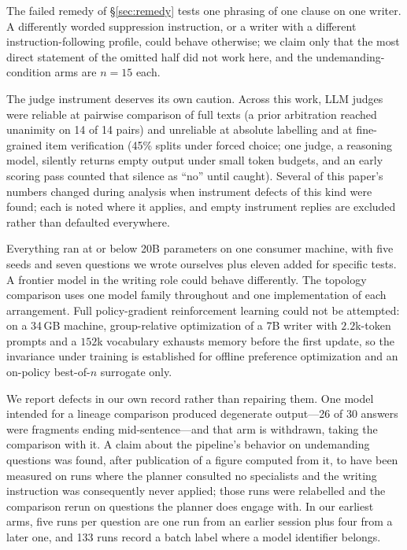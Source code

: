 \documentclass[11pt]{article}
\begin{document}
The failed remedy of \S\ref{sec:remedy} tests one phrasing of one clause on
one writer. A differently worded suppression instruction, or a writer with a
different instruction-following profile, could behave otherwise; we claim only
that the most direct statement of the omitted half did not work here, and the
undemanding-condition arms are $n{=}15$ each.

The judge instrument deserves its own caution. Across this work, LLM judges
were reliable at pairwise comparison of full texts (a prior arbitration
reached unanimity on 14 of 14 pairs) and unreliable at absolute labelling
and at fine-grained item verification (45\% splits under forced choice;
one judge, a reasoning model, silently returns empty output under small
token budgets, and an early scoring pass counted that silence as ``no''
until caught). Several of this paper's numbers changed during analysis when
instrument defects of this kind were found; each is noted where it applies,
and empty instrument replies are excluded rather than defaulted everywhere.

Everything ran at or below 20B parameters on one consumer machine, with five
seeds and seven questions we wrote ourselves plus eleven added for specific
tests. A frontier model in the writing role could behave differently. The
topology comparison uses one model family throughout and one implementation of
each arrangement. Full policy-gradient reinforcement learning could not be
attempted: on a 34\,GB machine, group-relative optimization of a 7B writer with
$2.2$k-token prompts and a $152$k vocabulary exhausts memory before the first
update, so the invariance under training is established for offline preference
optimization and an on-policy best-of-$n$ surrogate only.

We report defects in our own record rather than repairing them. One model
intended for a lineage comparison produced degenerate output---26 of 30
answers were fragments ending mid-sentence---and that arm is withdrawn, taking
the comparison with it. A claim about the pipeline's behavior on undemanding
questions was found, after publication of a figure computed from it, to have
been measured on runs where the planner consulted no specialists and the
writing instruction was consequently never applied; those runs were relabelled
and the comparison rerun on questions the planner does engage with. In our
earliest arms, five runs per question are one run from an earlier session plus
four from a later one, and 133 runs record a batch label where a model
identifier belongs.
\end{document}
